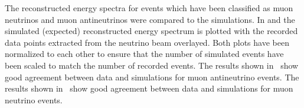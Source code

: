 
The reconstructed energy spectra for events which have been classified as muon neutrinos and muon antineutrinos were compared to the simulations. In  and  the simulated (expected) reconstructed energy spectrum is plotted with the recorded data points extracted from the neutrino beam overlayed. Both plots have been normalized to each other to ensure that the number of simulated events have been scaled to match the number of recorded events.
The results shown in~ show good agreement between data and simulations for muon antineutrino events. The results shown in~ show good agreement between data and simulations for muon neutrino events. %







